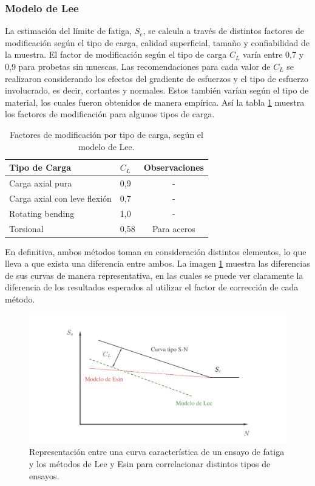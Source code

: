 \subsubsection{Modelo de Lee}
La estimación del límite de fatiga, $S_e$, se calcula a través de distintos factores de modificación según el tipo de carga, calidad superficial, tamaño y confiabilidad de la muestra. El factor de modificación según el tipo de carga $C_L$ varía entre 0,7 y 0,9 para probetas sin muescas. Las recomendaciones para cada valor de $C_L$ se realizaron considerando los efectos del gradiente de esfuerzos y el tipo de esfuerzo involucrado, es decir, cortantes y normales. Estos también varían según el tipo de material, los cuales fueron obtenidos de manera empírica. Así la tabla \ref{tab:lee_factor} muestra los factores de modificación para algunos tipos de carga.

\begin{table}[h]
\centering
\begin{tabular}{@{}llc@{}}
\toprule
Tipo de Carga                & $C_L$ & Observaciones \\ \midrule
Carga axial pura             & 0,9   & -                                 \\
Carga axial con leve flexión & 0,7   & -                                 \\
Rotating bending             & 1,0   & -                                 \\
Torsional                    & 0,58  & Para aceros   \\ \bottomrule
\end{tabular}
\caption{Factores de modificación por tipo de carga, según el modelo de Lee.}
\label{tab:lee_factor}
\end{table}

En definitiva, ambos métodos toman en consideración distintos elementos, lo que lleva a que exista una diferencia entre ambos. La imagen \ref{fig:comp_modfat} muestra las diferencias de sus curvas de manera representativa, en las cuales se puede ver claramente la diferencia de los resultados esperados al utilizar el factor de corrección de cada método.

\begin{figure}[h]
\centering
\includegraphics[width=1\linewidth, trim={6cm 1cm 5cm 2cm}, clip]{Imagenes/comp_modfat.pdf}
\caption{Representación entre una curva característica de un ensayo de fatiga y los métodos de Lee y Esin para correlacionar distintos tipos de ensayos. \cite{strzelecki2018analysis}}
\label{fig:comp_modfat}
\end{figure}

